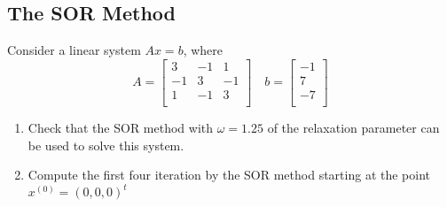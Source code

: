 \documentclass[../main-sheet.tex]{subfiles}
\begin{document}
    \subsection{The SOR Method}
    \begin{prob}
    Consider a linear system \(Ax=b\), where
    \[
        A=\begin{bmatrix}
            3 & -1 & 1 \\
            -1 & 3 & -1 \\
            1 & -1 & 3\\
        \end{bmatrix}
        \quad
        b=\begin{bmatrix}
            -1\\
            7  \\
            -7 \\
        \end{bmatrix}
    \]
    \begin{enumerate}[label=(\roman*)]
        \item Check that the SOR method with \(\omega=1.25\) of the relaxation parameter can be used to solve this system.
        \item Compute the first four iteration by the SOR method starting at the point \(x^{(0)}=(0,0,0)^t\)
    \end{enumerate}
\end{prob}
\end{document}
